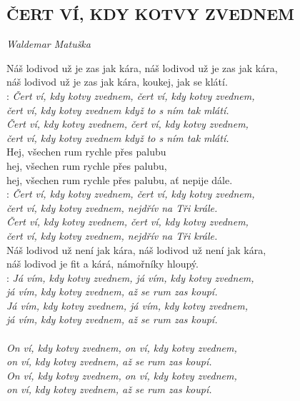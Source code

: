\begin{flushleft}
	\section*{\Huge ČERT VÍ, KDY KOTVY ZVEDNEM}
	\emph{Waldemar Matuška}
\end{flushleft}

Náš lodivod už je zas jak kára, náš lodivod už je zas jak kára,\\
náš lodivod už je zas jak kára, koukej, jak se klátí.\\

\textregistered:
\emph{Čert ví, kdy kotvy zvednem, čert ví, kdy kotvy zvednem,\\
čert ví, kdy kotvy zvednem když to s ním tak mlátí.\\
Čert ví, kdy kotvy zvednem, čert ví, kdy kotvy zvednem,\\
čert ví, kdy kotvy zvednem když to s ním tak mlátí.}\\

Hej, všechen rum rychle přes palubu\\
hej, všechen rum rychle přes palubu,\\
hej, všechen rum rychle přes palubu, ať nepije dále.\\

\textregistered:
\emph{Čert ví, kdy kotvy zvednem, čert ví, kdy kotvy zvednem,\\
čert ví, kdy kotvy zvednem, nejdřív na Tři krále.\\
Čert ví, kdy kotvy zvednem, čert ví, kdy kotvy zvednem,\\
čert ví, kdy kotvy zvednem, nejdřív na Tři krále.}\\

Náš lodivod už není jak kára, náš lodivod už není jak kára,\\
náš lodivod je fit a kárá, námořníky hloupý.\\

\textregistered:
\emph{Já vím, kdy kotvy zvednem, já vím, kdy kotvy zvednem,\\
já vím, kdy kotvy zvednem, až se rum zas koupí.\\
Já vím, kdy kotvy zvednem, já vím, kdy kotvy zvednem,\\
já vím, kdy kotvy zvednem, až se rum zas koupí.\\
\\
On ví, kdy kotvy zvednem, on ví, kdy kotvy zvednem,\\
on ví, kdy kotvy zvednem, až se rum zas koupí.\\
On ví, kdy kotvy zvednem, on ví, kdy kotvy zvednem,\\
on ví, kdy kotvy zvednem, až se rum zas koupí.}

\newpage
